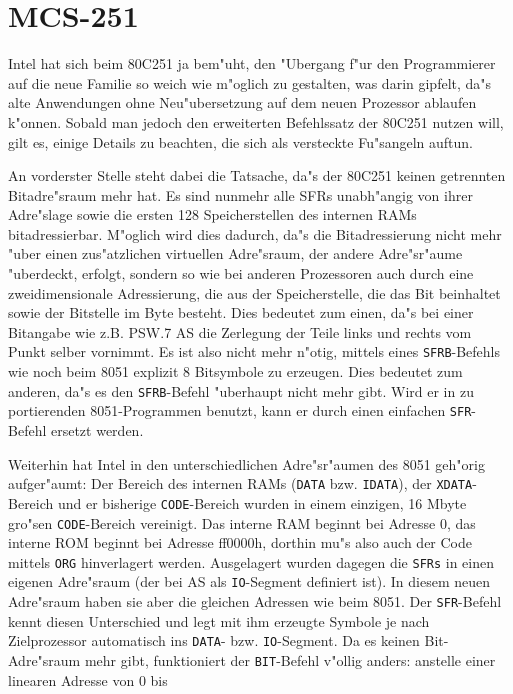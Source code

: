 \documentclass[12pt,a4paper,twoside]{report}
\newcommand{\tty}[1]{{\tt #1}}
\begin{document}
\section{MCS-251}

Intel hat sich beim 80C251 ja bem"uht, den "Ubergang f"ur den Programmierer
auf die neue Familie so weich wie m"oglich zu gestalten, was darin gipfelt,
da"s alte Anwendungen ohne Neu"ubersetzung auf dem neuen Prozessor ablaufen
k"onnen.  Sobald man jedoch den erweiterten Befehlssatz der 80C251 nutzen
will, gilt es, einige Details zu beachten, die sich als versteckte
Fu"sangeln auftun.
\par
An vorderster Stelle steht dabei die Tatsache, da"s der 80C251 keinen
getrennten Bitadre"sraum mehr hat.  Es sind nunmehr alle SFRs unabh"angig
von ihrer Adre"slage sowie die ersten 128 Speicherstellen des internen
RAMs bitadressierbar.  M"oglich wird dies dadurch, da"s die Bitadressierung
nicht mehr "uber einen zus"atzlichen virtuellen Adre"sraum, der andere
Adre"sr"aume "uberdeckt, erfolgt, sondern so wie bei anderen Prozessoren
auch durch eine zweidimensionale Adressierung, die aus der Speicherstelle,
die das Bit beinhaltet sowie der Bitstelle im Byte besteht.  Dies bedeutet
zum einen, da"s bei einer Bitangabe wie z.B. PSW.7 AS die Zerlegung der
Teile links und rechts vom Punkt selber vornimmt.  Es ist also nicht mehr
n"otig, mittels eines \tty{SFRB}-Befehls wie noch beim 8051 explizit 8
Bitsymbole zu erzeugen.  Dies bedeutet zum anderen, da"s es den
\tty{SFRB}-Befehl "uberhaupt nicht mehr gibt.  Wird er in zu portierenden
8051-Programmen benutzt, kann er durch einen einfachen \tty{SFR}-Befehl
ersetzt werden.
\par
Weiterhin hat Intel in den unterschiedlichen Adre"sr"aumen des 8051
geh"orig aufger"aumt: Der Bereich des internen RAMs (\tty{DATA} bzw.
\tty{IDATA}), der \tty{XDATA}-Bereich und er bisherige \tty{CODE}-Bereich
wurden in einem einzigen, 16 Mbyte gro"sen \tty{CODE}-Bereich vereinigt.
Das interne RAM beginnt bei Adresse 0, das interne ROM beginnt bei
Adresse ff0000h, dorthin mu"s also auch der Code mittels \tty{ORG}
hinverlagert werden.  Ausgelagert wurden dagegen die \tty{SFRs} in einen
eigenen Adre"sraum (der bei AS als \tty{IO}-Segment definiert ist).  In
diesem neuen Adre"sraum haben sie aber die gleichen Adressen wie beim 8051.
Der \tty{SFR}-Befehl kennt diesen Unterschied und legt mit ihm erzeugte
Symbole je nach Zielprozessor automatisch ins \tty{DATA}- bzw.
\tty{IO}-Segment.  Da es keinen Bit-Adre"sraum mehr gibt, funktioniert der
\tty{BIT}-Befehl v"ollig anders: anstelle einer linearen Adresse von 0 bis
\end{document}
